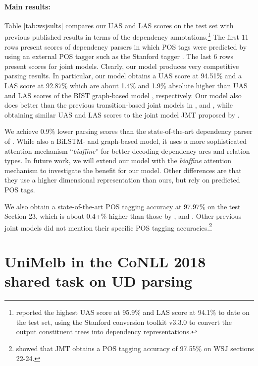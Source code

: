 \documentclass[11pt,letterpaper]{article}
\begin{document}
\paragraph{Main results:}  Table  \ref{tab:wsjsults} compares 
 our UAS and LAS scores  on the test set with previous published results in terms of the dependency annotations.\footnote{\citet{choe-charniak:2016:EMNLP2016}  reported  the highest UAS score at 95.9\% and LAS score at 94.1\%  to date on the test set, using the Stanford conversion toolkit v3.3.0 to convert the output constituent trees into  dependency representations.}    
 The first 11 rows present scores of dependency parsers in which POS tags were predicted by using an  external POS tagger such as the Stanford tagger \citep{N03-1033}. 
 The last 6 rows present scores for joint models. 
Clearly, our model produces very competitive parsing results.  
 In particular, our model obtains a  UAS score at 94.51\% and a LAS score at 92.87\% which are about  1.4\% and 1.9\% absolute higher than UAS and LAS scores   of the  BIST graph-based model \citep{TACL885}, respectively. Our model also does better than the previous transition-based joint models in  \citet{alberti-EtAl:2015:EMNLP},  \citet{zhang-weiss:2016:P16-1} and \citet{YangZLSYF18}, while obtaining similar UAS and LAS scores to the joint  model JMT proposed by \citet{hashimoto-EtAl:2017:EMNLP2017}. 
 
 We achieve 0.9\% lower parsing scores than the state-of-the-art  dependency parser of \citet{DozatM17}.
While also a BiLSTM- and graph-based model, it  uses a more sophisticated  attention mechanism  ``\textit{biaffine}'' for better decoding  dependency arcs and  relation types.
In future work, we will extend our model with the  \textit{biaffine} attention  mechanism to investigate the benefit for our model. Other differences are that they use a higher dimensional representation than ours, but rely on predicted POS tags.

We also obtain a state-of-the-art POS tagging accuracy at 97.97\%  on the test Section 23, which is about 0.4+\% higher than those by \citet{bohnet-nivre:2012:EMNLP-CoNLL}, \citet{alberti-EtAl:2015:EMNLP} and \citet{YangZLSYF18}. Other previous joint models did not mention their specific POS tagging accuracies.\footnote{\citet{hashimoto-EtAl:2017:EMNLP2017} showed that JMT obtains a POS tagging accuracy of 97.55\% on WSJ sections 22-24.}



\section{UniMelb in the CoNLL 2018 shared task on UD parsing}\label{sec:ud}
\end{document}
